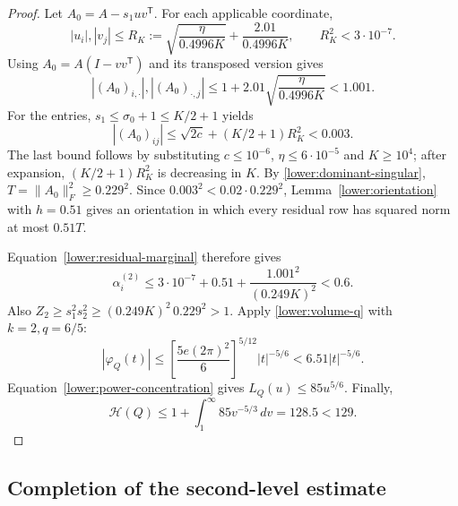 \begin{proof}
Let $A_0=A-s_1uv^{\mathsf T}$.  For each applicable coordinate,
\[
 |u_i|,|v_j|\leq R_K:=
      \sqrt{\frac\eta{0.4996K}}+\frac{2.01}{0.4996K},
 \qquad R_K^2<3\cdot10^{-7}.
\]
Using $A_0=A(I-vv^{\mathsf T})$ and its transposed version gives
\[
 |(A_0)_{i,\cdot}|,|(A_0)_{\cdot,j}|
 \leq1+2.01\sqrt{\frac\eta{0.4996K}}<1.001.
\]
For the entries, $s_1\leq\sigma_0+1\leq K/2+1$ yields
\[
 |(A_0)_{ij}|\leq\sqrt{2c}+(K/2+1)R_K^2<0.003.
\]
The last bound follows by substituting $c\leq10^{-6}$,
$\eta\leq6\cdot10^{-5}$ and $K\geq10^4$; after expansion,
$(K/2+1)R_K^2$ is decreasing in $K$.
By \eqref{lower:dominant-singular},
$T=\|A_0\|_F^2\geq0.229^2$.
Since $0.003^2<0.02\cdot0.229^2$, Lemma~\ref{lower:orientation}
with $h=0.51$ gives an orientation in which every residual row
has squared norm at most $0.51T$.

Equation~\eqref{lower:residual-marginal} therefore gives
\[
 \alpha_i^{(2)}
 \leq3\cdot10^{-7}+0.51+
            \frac{1.001^2}{(0.249K)^2}<0.6.
\]
Also $Z_2\geq s_1^2s_2^2\geq(0.249K)^2\,0.229^2>1$.
Apply \eqref{lower:volume-q} with $k=2,q=6/5$:
\[
 |\varphi_Q(t)|\leq
 \left[\frac{5e(2\pi)^2}{6}\right]^{5/12}|t|^{-5/6}
 <6.51|t|^{-5/6}.
\]
Equation~\eqref{lower:power-concentration} gives $L_Q(u)\leq85u^{5/6}$.
Finally,
\[
 \mathcal H(Q)\leq1+\int_1^\infty85v^{-5/3}\,dv
 =128.5<129.
\]
\end{proof}

\subsection{Completion of the second-level estimate}

